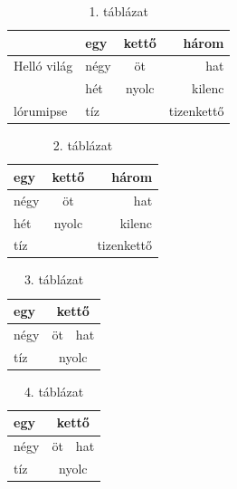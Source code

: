 \documentclass{article}
\begin{document}
\begin{table}
    \centering
    \caption{1. táblázat}
    \begin{tabular}{|m{30pt}||l|c|r|}
        \hline
         & egy & kettő & három \\ \hline
        Helló világ & négy & öt & hat \\ \hline
         & hét & nyolc & kilenc \\ \hline
        lórumipse& tíz & & tizenkettő \\ \hline
    \end{tabular}
    \label{tab:table1}
\end{table}
\hulipsum[3]

\begin{table}
    \centering
    \caption{2. táblázat}
    \begin{tabular}{|l|c|r|}
        \hline
        egy & kettő & három \\ \hline
        négy & öt & hat \\ \hline
        hét & nyolc & kilenc \\ \hline
        tíz & & tizenkettő \\ \hline
    \end{tabular}
    \label{tab:table2}
\end{table}
\hulipsum[2]

\begin{table}
    \centering
    \caption{3. táblázat}
    \begin{tabular}{|l|c|r|}
        \hline
        egy&\multicolumn{2}{|c|}{kettő}\\ \hline
        \multirow{2}{*}{négy} & öt & hat \\ \hline
        & \multicolumn{2}{|c|}{\multirow{2}{*}{nyolc}} \\ \hline
        tíz & &  \\ \hline
    \end{tabular}
    \label{tab:table3}
\end{table}

\begin{table}
    \centering
    \caption{4. táblázat}
    \begin{tabular}{|l|c|r|}
        \hline
        egy&\multicolumn{2}{|c|}{kettő}\\ \hline
        \multirow{2}{*}{négy} & öt & hat \\ \hline
        & \multicolumn{2}{|c|}{\multirow{2}{*}{nyolc}} \\ \hline
        tíz & &  \\ \hline
    \end{tabular}
    \label{tab:table4}
\end{table}
\end{document}
